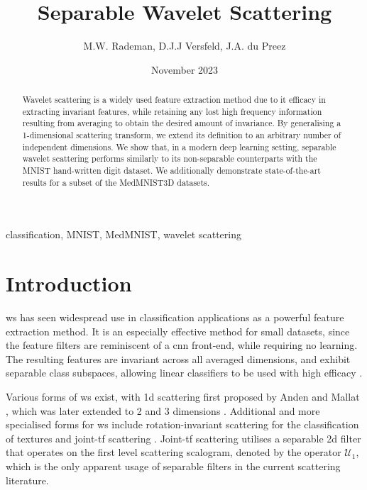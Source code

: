 \documentclass[journal]{IEEEtran}
\title{Separable Wavelet Scattering}
\author{M.W. Rademan, D.J.J Versfeld, J.A. du Preez }
\date{November 2023}
\begin{document}
\maketitle

\begin{abstract}
Wavelet scattering is a widely used feature extraction method due to it efficacy in extracting invariant features, while retaining any lost high frequency information resulting from averaging to obtain the desired amount of invariance. By generalising a 1-dimensional scattering transform, we extend its definition to an arbitrary number of independent dimensions. We show that, in a modern deep learning setting, separable wavelet scattering performs similarly to its non-separable counterparts with the MNIST hand-written digit dataset. We additionally demonstrate state-of-the-art results for a subset of the MedMNIST3D datasets.
\end{abstract}

\begin{IEEEkeywords}
classification, MNIST, MedMNIST, wavelet scattering
\end{IEEEkeywords}

\section{Introduction}
\Ac{ws} has seen widespread use in classification applications as a powerful feature extraction method. It is an especially effective method for small datasets, since the feature filters are reminiscent of a \ac{cnn} front-end, while requiring no learning. The resulting features are invariant across all averaged dimensions, and exhibit separable class subspaces, allowing linear classifiers to be used with high efficacy \cite{2dscattering}.

Various forms of \ac{ws} exist, with \ac{1d} scattering first proposed by Anden and Mallat \cite{1dscattering1, 1dscattering2}, which was later extended to 2 \cite{2dscattering} and 3 dimensions \cite{3dscattering, harmonicscattering}. Additional and more specialised forms for \ac{ws} include rotation-invariant scattering \cite{groupinvariantscattering} for the classification of textures and joint-\ac{tf} scattering \cite{jointtfscattering1, jointtfscattering2}. Joint-\ac{tf} scattering utilises a separable \ac{2d} filter that operates on the first level scattering scalogram, denoted by the operator $\mathcal{U}_1$, which is the only apparent usage of separable filters in the current scattering literature. 
\end{document}
